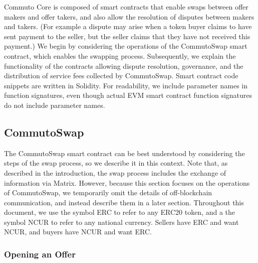 \documentclass[11pt]{article}
\begin{document}
    Commuto Core is composed of smart contracts that enable swaps between offer makers and offer
    takers, and also allow the resolution of disputes between makers and takers.
    (For example a dispute may arise when a token buyer claims to have sent payment to the seller,
    but the seller claims that they have not received this payment.)
    We begin by considering the operations of the CommutoSwap smart contract, which enables the
    swapping process.
    Subsequently, we explain the functionality of the contracts allowing dispute resolution,
    governance, and the distribution of service fees collected by CommutoSwap.
    Smart contract code snippets are written in Solidity\cite{Solidity}.
    For readability, we include parameter names in function signatures, even though actual EVM smart
    contract function signatures do not include parameter names.

    \subsection*{CommutoSwap}

    The CommutoSwap smart contract can be best understood by considering the steps of the swap
    process, so we describe it in this context.
    Note that, as described in the introduction, the swap process includes the exchange of
    information via Matrix.
    However, because this section focuses on the operations of CommutoSwap, we temporarily omit the
    details of off-blockchain communication, and instead describe them in a later section.
    Throughout this document, we use the symbol ERC to refer to any ERC20 token, and a the symbol
    NCUR to refer to any national currency.
    Sellers have ERC and want NCUR, and buyers have NCUR and want ERC.

    \subsubsection*{Opening an Offer}
\end{document}
